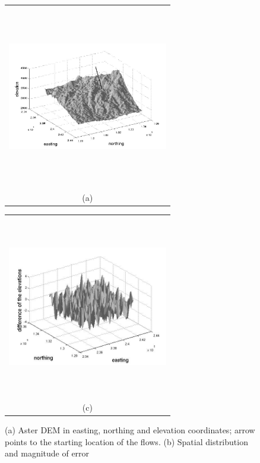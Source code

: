 \documentclass[a4paper,fleqn]{article}
\newcommand{\Pic}[2][0.85]{\begin{center}\texttt{[image: \#2]}
 \end{center} }
\begin{document}
\begin{figure}[H]
    \begin{minipage}[b]{0.6\textwidth}
        \begin{tabular}{c}
        \includegraphics[width=7cm,height=8cm,keepaspectratio]{xfig_rot.jpg}\\
        (a)
        \end{tabular}
    \end{minipage}
    \begin{minipage}{0.6\textwidth}
        \begin{tabular}{c}
        \includegraphics[width=7cm,height=8cm,keepaspectratio]{error3_res.jpg}\\
        (c)
        \end{tabular}
    \end{minipage} 	
\caption{(a) Aster DEM in easting, northing and elevation coordinates; arrow points to the starting location of the flows. (b) Spatial distribution and magnitude of error}
\label{fig1}  
\end{figure}
\end{document}
